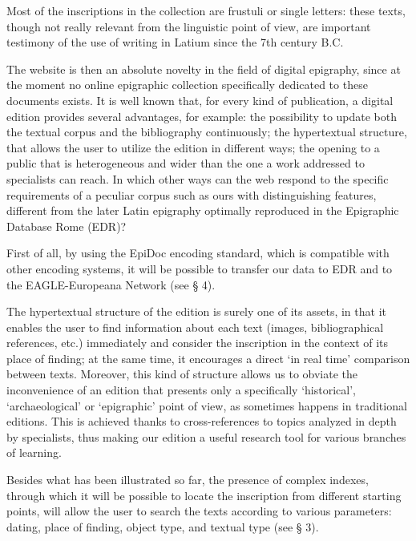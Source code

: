 \documentclass[amsthm,ebook]{saparticle}
\begin{document}
Most of the inscriptions in the collection are frustuli or single letters: these texts, though not really relevant from
the linguistic point of view, are important testimony of the use of writing in Latium since the 7th century B.C. 

The website is then an absolute novelty in the field of digital epigraphy, since at the moment no online epigraphic
collection specifically dedicated to these documents exists. It is well known that, for every kind of publication, a
digital edition provides several advantages, for example: the possibility to update both the textual corpus and the
bibliography continuously; the hypertextual structure, that allows the user to utilize the edition in different ways;
the opening to a public that is heterogeneous and wider than the one a work addressed to specialists can reach. In
which other ways can the web respond to the specific requirements of a peculiar corpus such as ours with distinguishing
features, different from the later Latin epigraphy optimally reproduced in the Epigraphic Database Rome (EDR)?

First of all, by using the EpiDoc encoding standard, which is compatible with other encoding systems, it will be
possible to transfer our data to EDR and to the EAGLE-Europeana Network (see § 4).

The hypertextual structure of the edition is surely one of its assets, in that it enables the user to find information
about each text (images, bibliographical references, etc.) immediately and consider the inscription in the context of
its place of finding; at the same time, it encourages a direct `in real time' comparison between texts. Moreover,
this kind of structure allows us to obviate the inconvenience of an edition that presents only a specifically
`historical', `archaeological' or `epigraphic' point of view, as sometimes happens in traditional
editions. This is achieved thanks to cross-references to topics analyzed in depth by specialists, thus making our
edition a useful research tool for various branches of learning.

Besides what has been illustrated so far, the presence of complex indexes, through which it will be possible to locate
the inscription from different starting points, will allow the user to search the texts according to various
parameters: dating, place of finding, object type, and textual type (see § 3). 
\end{document}
